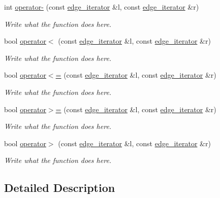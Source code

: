 \begin{DoxyCompactItemize}
int \hyperlink{classedge__iterator_a85016c8190c146f02194942120d797a2}{operator-\/} (const \hyperlink{classedge__iterator}{edge\+\_\+iterator} \&l, const \hyperlink{classedge__iterator}{edge\+\_\+iterator} \&r)
\begin{DoxyCompactList}\small\item\em Write what the function does here. \end{DoxyCompactList}\item 
bool \hyperlink{classedge__iterator_a23a3dd85c962c0c5a4bf0b30e7696576}{operator$<$} (const \hyperlink{classedge__iterator}{edge\+\_\+iterator} \&l, const \hyperlink{classedge__iterator}{edge\+\_\+iterator} \&r)
\begin{DoxyCompactList}\small\item\em Write what the function does here. \end{DoxyCompactList}\item 
bool \hyperlink{classedge__iterator_a301c07a77180ec86202103484fdfc7eb}{operator$<$=} (const \hyperlink{classedge__iterator}{edge\+\_\+iterator} \&l, const \hyperlink{classedge__iterator}{edge\+\_\+iterator} \&r)
\begin{DoxyCompactList}\small\item\em Write what the function does here. \end{DoxyCompactList}\item 
bool \hyperlink{classedge__iterator_abd25c6fb3a8cc28addbb46e9775ce14c}{operator$>$=} (const \hyperlink{classedge__iterator}{edge\+\_\+iterator} \&l, const \hyperlink{classedge__iterator}{edge\+\_\+iterator} \&r)
\begin{DoxyCompactList}\small\item\em Write what the function does here. \end{DoxyCompactList}\item 
bool \hyperlink{classedge__iterator_afb0a71f83c2fbd013fd42f6a91fdbc99}{operator$>$} (const \hyperlink{classedge__iterator}{edge\+\_\+iterator} \&l, const \hyperlink{classedge__iterator}{edge\+\_\+iterator} \&r)
\begin{DoxyCompactList}\small\item\em Write what the function does here. \end{DoxyCompactList}\end{DoxyCompactItemize}


\subsection{Detailed Description}


